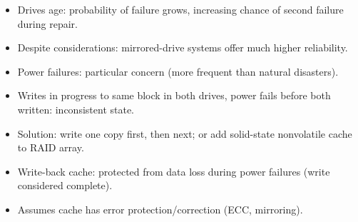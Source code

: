 \begin{itemize}
    \item Drives age: probability of failure grows, increasing chance of second failure during repair.
    \item Despite considerations: mirrored-drive systems offer much higher reliability.
    \item Power failures: particular concern (more frequent than natural disasters).
    \item Writes in progress to same block in both drives, power fails before both written: inconsistent state.
    \item Solution: write one copy first, then next; or add solid-state nonvolatile cache to RAID array.
    \item Write-back cache: protected from data loss during power failures (write considered complete).
    \item Assumes cache has error protection/correction (ECC, mirroring).
\end{itemize}

